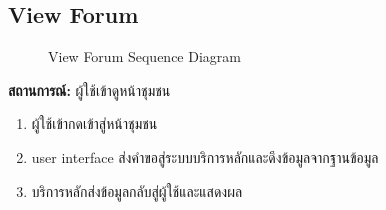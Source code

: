\subsection{View Forum}
\begin{figure}[H]\centering
    \setlength{\fboxrule}{0.2mm} %
    \caption{View Forum Sequence Diagram}\label{fig:viewForumSeqDiagram}
\end{figure}
\textbf{สถานการณ์: }ผู้ใช้เข้าดูหน้าชุมชน
\begin{enumerate}
    \item ผู้ใช้เข้ากดเข้าสู่หน้าชุมชน
    \item user interface ส่งคำขอสู่ระบบบริการหลักและดึงข้อมูลจากฐานข้อมูล
    \item บริการหลักส่งข้อมูลกลับสู่ผู้ใช้และแสดงผล
\end{enumerate}

